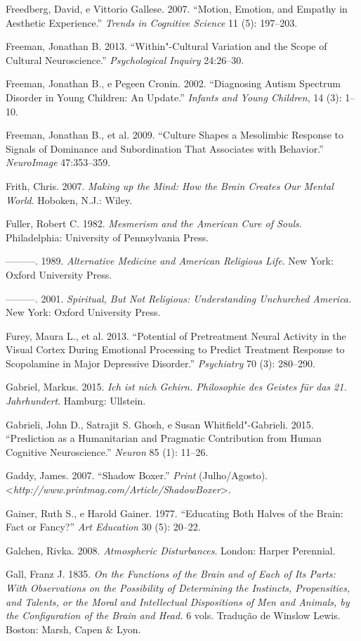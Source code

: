 Freedberg, David, e Vittorio Gallese. 2007. ``Motion, Emotion, and
Empathy in Aesthetic Experience.'' \emph{Trends in Cognitive Science} 11
(5): 197--203.

Freeman, Jonathan B. 2013. ``Within"-Cultural Variation and the Scope of
Cultural Neuroscience.'' \emph{Psychological Inquiry} 24:26--30.

Freeman, Jonathan B., e Pegeen Cronin. 2002. ``Diagnosing Autism
Spectrum Disorder in Young Children: An Update.'' \emph{Infants and
Young Children}, 14 (3): 1--10.

Freeman, Jonathan B., et al. 2009. ``Culture Shapes a Mesolimbic
Response to Signals of Dominance and Subordination That Associates with
Behavior.'' \emph{NeuroImage} 47:353--359.

Frith, Chris. 2007. \emph{Making up the Mind: How the Brain Creates Our
Mental World}. Hoboken, N.J.: Wiley.

Fuller, Robert C. 1982. \emph{Mesmerism and the American Cure of Souls}.
Philadelphia: University of Pennsylvania Press.

---------. 1989. \emph{Alternative Medicine and American Religious
Life}. New York: Oxford University Press.

---------. 2001. \emph{Spiritual, But Not Religious: Understanding
Unchurched America.} New York: Oxford University Press.

Furey, Maura L., et al. 2013. ``Potential of Pretreatment Neural
Activity in the Visual Cortex During Emotional Processing to Predict
Treatment Response to Scopolamine in Major Depressive Disorder.''
\emph{ Psychiatry} 70 (3): 280--290.

Gabriel, Markus. 2015. \emph{Ich ist nich Gehirn. Philosophie des
Geistes für das 21. Jahrhundert}. Hamburg: Ullstein.

Gabrieli, John D., Satrajit S. Ghosh, e Susan Whitfield"-Gabrieli. 2015.
``Prediction as a Humanitarian and Pragmatic Contribution from Human
Cognitive Neuroscience.'' \emph{Neuron} 85 (1): 11--26.

Gaddy, James. 2007. ``Shadow Boxer.'' \emph{Print} (Julho/Agosto).
\textless{}\emph{http://www.printmag.com/Article/ShadowBoxer}\textgreater{}.

Gainer, Ruth S., e Harold Gainer. 1977. ``Educating Both Halves of the
Brain: Fact or Fancy?'' \emph{Art Education} 30 (5): 20--22.

Galchen, Rivka. 2008. \emph{Atmospheric Disturbances}. London: Harper
Perennial.

Gall, Franz J. 1835. \emph{On the Functions of the Brain and of Each of
Its Parts: With Observations on the Possibility of Determining the
Instincts, Propensities, and Talents, or the Moral and Intellectual
Dispositions of Men and Animals, by the Configuration of the Brain and
Head.} 6 vols. Tradução de Winslow Lewis. Boston: Marsh, Capen \& Lyon.

